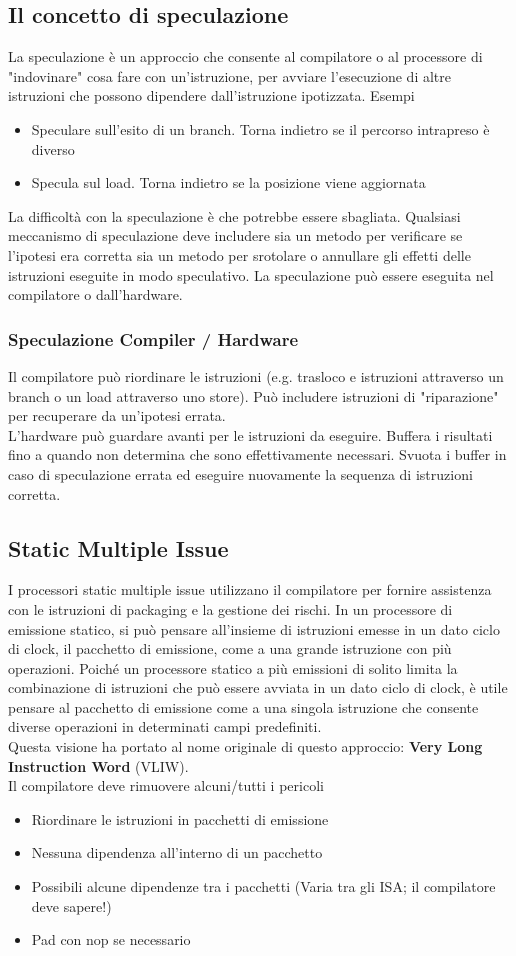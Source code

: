 \documentclass[12pt,a4paper]{article}
\begin{document}
\subsection{Il concetto di speculazione}
La speculazione è un approccio che consente al compilatore o al processore di "indovinare" cosa fare con un'istruzione, per avviare l'esecuzione di altre istruzioni che possono dipendere dall'istruzione ipotizzata.
Esempi
\begin{itemize}
\item Speculare sull'esito di un branch. Torna indietro se il percorso intrapreso è diverso 
\item Specula sul load. Torna indietro se la posizione viene aggiornata
\end{itemize}
La difficoltà con la speculazione è che potrebbe essere sbagliata. Qualsiasi meccanismo di speculazione deve includere sia un metodo per verificare se l'ipotesi era corretta sia un metodo per srotolare o annullare gli effetti delle istruzioni eseguite in modo speculativo. La speculazione può essere eseguita nel compilatore o dall'hardware.
\subsubsection{Speculazione Compiler / Hardware}
Il compilatore può riordinare le istruzioni (e.g. trasloco e istruzioni attraverso un branch o un load attraverso uno store). Può includere istruzioni di "riparazione" per recuperare da un'ipotesi errata.\\
L'hardware può guardare avanti per le istruzioni da eseguire. Buffera i risultati fino a quando non determina che sono effettivamente necessari. Svuota i buffer in caso di speculazione errata ed eseguire nuovamente la sequenza di istruzioni corretta.
\subsection{Static Multiple Issue}
I processori static multiple issue utilizzano il compilatore per fornire assistenza con le istruzioni di packaging e la gestione dei rischi. In un processore di emissione statico, si può pensare all'insieme di istruzioni emesse in un dato ciclo di clock, il pacchetto di emissione, come a una grande istruzione con più operazioni. Poiché un processore statico a più emissioni di solito limita la combinazione di istruzioni che può essere avviata in un dato ciclo di clock, è utile pensare al pacchetto di emissione come a una singola istruzione che consente diverse operazioni in determinati campi predefiniti.\\
Questa visione ha portato al nome originale di questo approccio: \textbf{Very Long Instruction Word} (VLIW).\\
Il compilatore deve rimuovere alcuni/tutti i pericoli
\begin{itemize}
\item Riordinare le istruzioni in pacchetti di emissione
\item Nessuna dipendenza all'interno di un pacchetto
\item Possibili alcune dipendenze tra i pacchetti (Varia tra gli ISA; il compilatore deve sapere!)
\item Pad con nop se necessario
\end{itemize}
\end{document}
